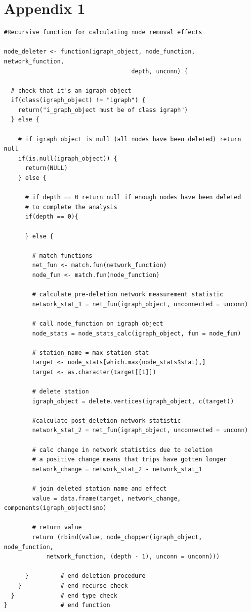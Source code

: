 \documentclass[11pt]{article} %
\begin{document}
\section{Appendix 1}

\begin{verbatim}
#Recursive function for calculating node removal effects
  
node_deleter <- function(igraph_object, node_function, network_function, 
									depth, unconn) {

  # check that it's an igraph object
  if(class(igraph_object) != "igraph") {
    return("i_graph_object must be of class igraph")
  } else {
    
    # if igraph object is null (all nodes have been deleted) return null
    if(is.null(igraph_object)) {
      return(NULL)
    } else {
      
      # if depth == 0 return null if enough nodes have been deleted 
      # to complete the analysis
      if(depth == 0){
        
      } else {
        
        # match functions
        net_fun <- match.fun(network_function)
        node_fun <- match.fun(node_function)
        
        # calculate pre-deletion network measurement statistic 
        network_stat_1 = net_fun(igraph_object, unconnected = unconn)
        
        # call node_function on igraph object
        node_stats = node_stats_calc(igraph_object, fun = node_fun)
        
        # station_name = max station stat
        target <- node_stats[which.max(node_stats$stat),]
        target <- as.character(target[[1]])
        
        # delete station
        igraph_object = delete.vertices(igraph_object, c(target))
        
        #calculate post_deletion network statistic
        network_stat_2 = net_fun(igraph_object, unconnected = unconn)
        
        # calc change in network statistics due to deletion
        # a positive change means that trips have gotten longer
        network_change = network_stat_2 - network_stat_1
        
        # join deleted station name and effect
        value = data.frame(target, network_change, components(igraph_object)$no)
        
        # return value
        return (rbind(value, node_chopper(igraph_object, node_function, 
        	network_function, (depth - 1), unconn = unconn)))
        
      } 		# end deletion procedure
    } 			# end recurse check 
  } 			# end type check 
} 				# end function


\end{verbatim}

\nocite{*}


\printbibliography
\end{document}
